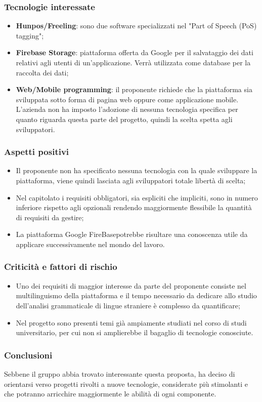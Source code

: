\subsubsection{Tecnologie interessate}
\begin{itemize}
	\item \textbf{Hunpos\glo/Freeling\glo}: sono due software specializzati nel "Part
	of Speech (PoS) tagging"\glo;
	
	\item \textbf{Firebase Storage\glo}: piattaforma offerta da Google per il salvataggio dei dati relativi agli utenti di un'applicazione. Verrà utilizzata come database per la raccolta dei dati;
	 
	\item \textbf{Web/Mobile programming}: il proponente richiede che la
	piattaforma sia sviluppata sotto forma di pagina web oppure come
	applicazione mobile. L'azienda non ha imposto l'adozione di nessuna
	tecnologia specifica per quanto riguarda questa parte del progetto, quindi
	la scelta spetta agli sviluppatori.		
\end{itemize}
\subsubsection{Aspetti positivi}
\begin{itemize}
	\item Il proponente non ha specificato nessuna tecnologia con la quale
	 sviluppare la piattaforma, viene quindi lasciata agli sviluppatori totale
	 libertà di scelta;
	\item Nel capitolato i requisiti obbligatori, sia espliciti che impliciti,
	 sono in numero inferiore rispetto agli opzionali rendendo maggiormente
	 flessibile la quantità di requisiti da gestire;
	\item La piattaforma Google FireBase\glosp potrebbe risultare una conoscenza
	 utile da applicare successivamente nel mondo del lavoro.
	
\end{itemize}

\subsubsection{Criticità e fattori di rischio}

\begin{itemize}
	\item Uno dei requisiti di maggior interesse da parte del
	 proponente consiste nel multilinguismo della piattaforma e il tempo
	 necessario da dedicare allo studio dell'analisi grammaticale di lingue straniere è
	 complesso da quantificare;
	
	\item Nel progetto sono presenti temi già ampiamente studiati nel corso di
	 studi universitario, per cui non si amplierebbe il bagaglio di
	 tecnologie conosciute.
 	
\end{itemize}
\subsubsection{Conclusioni}
Sebbene il gruppo abbia trovato interessante questa proposta, ha deciso
di orientarsi verso progetti rivolti a nuove tecnologie, considerate più
stimolanti e che potranno arricchire maggiormente le abilità di ogni 
componente. 


